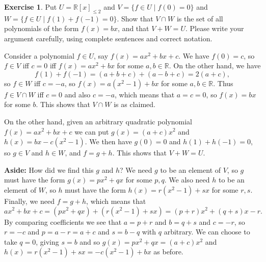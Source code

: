 \documentclass{amsart}
\newcommand{\R}         {{\mathbb{R}}}
\newcommand{\st}        {\;|\;}
\renewcommand{\:}       {\colon}
\theoremstyle{definition}
\newtheorem{exercise}{Exercise}[section]
\renewenvironment{solution}{\SolutionAtEnd}{\endSolutionAtEnd}
\begin{document}
\begin{exercise}
 Put $U=\R[x]_{\leq 2}$ and $V=\{f\in U\st f(0)=0\}$ and
 $W=\{f\in U\st f(1)+f(-1)=0\}$.  Show that $V\cap W$ is the
 set of all polynomials of the form $f(x)=bx$, and that
 $V+W=U$.  Please write your argument carefully, using
 complete sentences and correct notation.
\end{exercise}
\begin{solution}
 Consider a polynomial $f\in U$, say $f(x)=ax^2+bx+c$.  We
 have $f(0)=c$, so $f\in V$ iff $c=0$ iff $f(x)=ax^2+bx$ for
 some $a,b\in\R$.  On the other hand, we have 
 \[ f(1) + f(-1) = (a+b+c) + (a-b+c) = 2(a+c), \]
 so $f\in W$ iff $c=-a$, so $f(x)=a(x^2-1)+bx$ for some
 $a,b\in\R$.  Thus $f\in V\cap W$ iff $c=0$ and also $c=-a$,
 which means that $a=c=0$, so $f(x)=bx$ for some $b$.  This
 shows that $V\cap W$ is as claimed.

 On the other hand, given an arbitrary quadratic polynomial
 $f(x)=ax^2+bx+c$ we can put $g(x)=(a+c)x^2$ and
 $h(x)=bx-c(x^2-1)$.  We then have $g(0)=0$ and
 $h(1)+h(-1)=0$, so $g\in V$ and $h\in W$, and $f=g+h$.
 This shows that $V+W=U$.

 \textbf{Aside:} 
 How did we find this $g$ and $h$?  We need $g$ to be an element of
 $V$, so $g$ must have the form $g(x)=px^2+qx$ for some $p,q$.  We
 also need $h$ to be an element of $W$, so $h$ must have the form
 $h(x)=r(x^2-1)+sx$ for some $r,s$.  Finally, we need $f=g+h$, which
 means that 
 \[ ax^2+bx+c = (px^2+qx)+(r(x^2-1)+sx) 
     = (p+r)x^2 + (q+s)x - r.
 \] 
 By comparing coefficients we see that $a=p+r$ and $b=q+s$ and $c=-r$,
 so $r=-c$ and $p=a-r=a+c$ and $s=b-q$ with $q$ arbitrary.  We can
 choose to take $q=0$, giving $s=b$ and so $g(x)=px^2+qx=(a+c)x^2$ and
 $h(x)=r(x^2-1)+sx=-c(x^2-1)+bx$ as before.
\end{solution}
\end{document}
